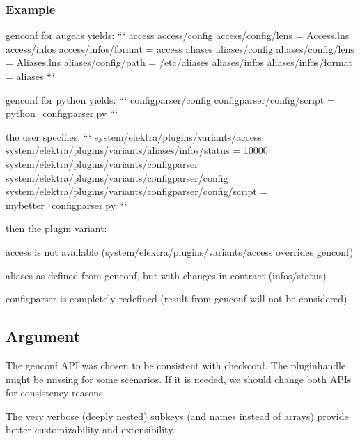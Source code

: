 \subsubsection*{Example}

{\ttfamily genconf} for augeas yields\+: ``` access access/config access/config/lens = Access.\+lns access/infos access/infos/format = access aliases aliases/config aliases/config/lens = Aliases.\+lns aliases/config/path = /etc/aliases aliases/infos aliases/infos/format = aliases ```

{\ttfamily genconf} for python yields\+: ``` configparser/config configparser/config/script = python\+\_\+configparser.\+py ```

the user specifies\+: ``` system/elektra/plugins/variants/access system/elektra/plugins/variants/aliases/infos/status = 10000 system/elektra/plugins/variants/configparser system/elektra/plugins/variants/configparser/config system/elektra/plugins/variants/configparser/config/script = mybetter\+\_\+configparser.\+py ```

then the plugin variant\+:


\begin{DoxyEnumerate}
\item {\ttfamily access} is not available ({\ttfamily system/elektra/plugins/variants/access} overrides {\ttfamily genconf})
\item {\ttfamily aliases} as defined from {\ttfamily genconf}, but with changes in contract ({\ttfamily infos/status})
\item {\ttfamily configparser} is completely redefined (result from {\ttfamily genconf} will not be considered)
\end{DoxyEnumerate}

\subsection*{Argument}


\begin{DoxyItemize}
\item The {\ttfamily genconf} A\+P\+I was chosen to be consistent with {\ttfamily checkconf}. The pluginhandle might be missing for some scenarios. If it is needed, we should change both A\+P\+Is for consistency reasons.
\item The very verbose (deeply nested) subkeys (and names instead of arrays) provide better customizability and extensibility.
\end{DoxyItemize}

